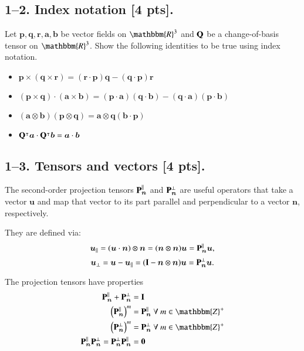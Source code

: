 \bigskip
\subsection*{1--2. \textbf{Index notation} [4 pts].} Let $\bm{p}, \bm{q}, \bm{r}, \bm{a}, \bm{b}$ be vector fields on $\mathbbm{R}^3$ and $\mathbf{Q}$ be a change-of-basis tensor on $\mathbbm{R}^3$. Show the following identities to be true using index notation. 

\begin{itemize}
    \item $\bm{p} \times (\bm{q} \times \bm{r}) = (\bm{r} \cdot \bm{p}) \bm{q} - (\bm{q} \cdot \bm{p}) \bm{r}$
    \item $(\bm{p} \times \bm{q}) \cdot (\bm{a} \times \bm{b}) = (\bm{p} \cdot \bm{a}) (\bm{q} \cdot \bm{b}) - (\bm{q} \cdot \bm{a})(\bm{p} \cdot \bm{b})$
    \item $(\bm{a} \otimes \bm{b})(\bm{p} \otimes \bm{q}) = \bm{a}\otimes\bm{q}(\bm{b} \cdot \bm{p}) $
    \item $\mathbf{Q}^\intercal\bm{a} \cdot \mathbf{Q}^\intercal\bm{b} = \bm{a}\cdot\bm{b} $
\end{itemize}

\subsection*{1--3. \textbf{Tensors and vectors} [4 pts].}
The second-order projection tensors $\mathbf{P}_{\bm{n}}^{||}$ and $\mathbf{P}_{\bm{n}}^{\perp}$ are useful operators that take a vector $\bm{u}$ and map that vector to its part parallel and perpendicular to a vector $\bm{n}$, respectively. 

They are defined via:
\begin{equation*}
    \bm{u}_{||} = (\bm{u} \cdot \bm{n}) \otimes \bm{n} = (\bm{n} \otimes \bm{n}) \bm{u} = \mathbf{P}_{\bm{n}}^{||} \bm{u},
\end{equation*}
\begin{equation*}
    \bm{u}_{\perp} = \bm{u} - \bm{u}_{||} = (\mathbf{I} - \bm{n} \otimes \bm{n}) \bm{u} = \mathbf{P}_{\bm{n}}^{\perp} \bm{u}.
\end{equation*}

The projection tensors have properties
\begin{align*}
    \bn{P}_{\bm{n}}^{||} + \bn{P}_{\bm{n}}^{\perp} &= \bn{I} \\
    \left(\bn{P}_{\bm{n}}^{||} \right)^m &= \bn{P}_{\bm{n}}^{||} ~\forall ~m \in \mathbbm{Z}^+\\
    \left(\bn{P}_{\bm{n}}^{\perp} \right)^m &= \bn{P}_{\bm{n}}^{\perp} ~\forall ~m \in \mathbbm{Z}^+\\
    \bn{P}_{\bm{n}}^{||} \bn{P}_{\bm{n}}^{\perp} = \bn{P}_{\bm{n}}^{\perp} \bn{P}_{\bm{n}}^{||}  &= \bn{0}
\end{align*}

